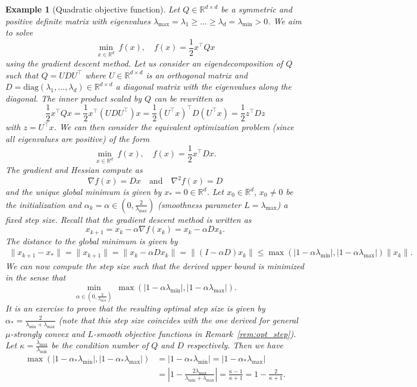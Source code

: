 \documentclass[12pt,openany]{book}
\newtheorem{example}[thm]{Example}
\theoremstyle{definition}
\theoremstyle{definition}
\newcommand{\R}{\mathbb{R}}
\begin{document}
\begin{example}[Quadratic objective function]\label{ex:quadratic}
Let $Q\in\R^{d\times d}$ be a symmetric and positive definite matrix with eigenvalues $\lambda_{\max}=\lambda_1\ge \dots\ge \lambda_d=\lambda_{\min} >0$. We aim to solve
\[\min_{x\in\R^d}\ f(x),\quad f(x) = \frac12x^\top Q x \]
using the gradient descent method. Let us consider an eigendecomposition of $Q$ such that
$Q=UDU^\top$ where $U\in\R^{d\times d}$ is an orthogonal matrix and $D={\mathrm{diag}}(\lambda_1,\dots,\lambda_d)\in\R^{d\times d}$ a diagonal matrix with the eigenvalues along the diagonal. The inner product scaled by $Q$ can be rewritten as 
\[\frac12x^\top Q x = \frac12 x^\top (UDU^\top) x = \frac12 (U^\top x)^\top D (U^\top x) = \frac12 z^\top D z \]
with $z=U^\top x$. We can then consider the equivalent optimization problem (since all eigenvalues are positive) of the form
\[\min_{x\in\R^d}\ f(x),\quad f(x) = \frac12 x^\top Dx. \]
The gradient and Hessian compute as
\[\nabla f(x) = Dx \quad \text{and}\quad \nabla^2f(x) = D\]
and the unique global minimum is given by $x_\ast=0\in\R^d$. Let $x_0\in\R^d$, $x_0\neq0$ be the initialization and $\alpha_k = \alpha \in(0,\frac{2}{\lambda_{\max}})$ (smoothness parameter $L=\lambda_{\max}$) a fixed step size. Recall that the gradient descent method is written as
\[x_{k+1} = x_k -\alpha \nabla f(x_k) = x_k - \alpha D x_k. \]
The distance to the global minimum is given by
\begin{align*}
\|x_{k+1}-x_\ast\| = \|x_{k+1} \| = \|x_k-\alpha Dx_k\| = \|(I-\alpha D) x_k\| \le \max(|1-\alpha\lambda_{\min}|,|1-\alpha\lambda_{\max}|) \|x_k\|.
\end{align*}
We can now compute the step size such that the derived upper bound is minimized in the sense that
\[\min_{\alpha\in(0,\frac{2}{\lambda_{\max}})}\  \max(|1-\alpha\lambda_{\min}|,|1-\alpha\lambda_{\max}|). \]
It is an exercise to prove that the resulting optimal step size is given by $\alpha_\ast = \frac{2}{\lambda_{\min}+\lambda_{\max}}$ (note that this step size coincides with the one derived for general $\mu$-strongly convex and $L$-smooth objective functions in Remark~\ref{rem:opt_step}). Let $\kappa = \frac{\lambda_{\max}}{\lambda_{\min}}$ be the condition number of $Q$ and $D$ respectively. Then we have
\begin{align*}
\max(|1-\alpha_\ast \lambda_{\min}|,|1-\alpha_\ast\lambda_{\max}|) &= |1-\alpha_\ast\lambda_{\min}| = |1-\alpha_\ast\lambda_{\max}| \\ &= \left|1-\frac{2\lambda_{\max}}{\lambda_{\min}+\lambda_{\max}}\right| = \frac{\kappa-1}{\kappa+1} = 1-\frac{2}{\kappa+1}.

\end{align*}
\end{example}
\end{document}
